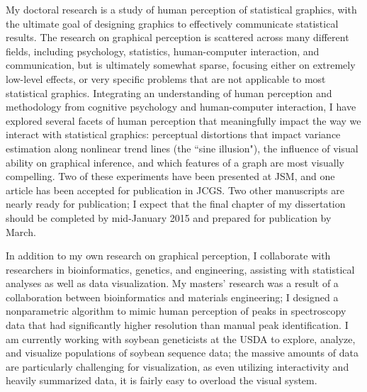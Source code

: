 \documentclass[11pt,letterpaper,sans,unicode]{moderncv}        %
\begin{document}
\vspace{.5cm}
My doctoral research is a study of human perception of statistical graphics, with the ultimate goal of designing graphics to effectively communicate statistical results. The research on graphical perception is scattered across many different fields, including psychology, statistics, human-computer interaction, and communication, but is ultimately somewhat sparse, focusing either on extremely low-level effects, or very specific problems that are not applicable to most statistical graphics. Integrating an understanding of human perception and methodology from cognitive psychology and human-computer interaction, I have explored several facets of human perception that meaningfully impact the way we interact with statistical graphics: perceptual distortions that impact variance estimation along nonlinear trend lines (the ``sine illusion"), the influence of visual ability on graphical inference, and which features of a graph are most visually compelling. Two of these experiments have been presented at JSM, and one article has been accepted for publication in JCGS. Two other manuscripts are nearly ready for publication; I expect that the final chapter of my dissertation should be completed by mid-January 2015 and prepared for publication by March. 

\vspace{.25cm}
In addition to my own research on graphical perception, I collaborate with researchers in bioinformatics, genetics, and engineering, assisting with statistical analyses as well as data visualization. My masters' research was a result of a collaboration between bioinformatics and materials engineering; I designed a nonparametric algorithm to mimic human perception of peaks in spectroscopy data that had significantly higher resolution than manual peak identification. I am currently working with soybean geneticists at the USDA to explore, analyze, and visualize populations of soybean sequence data; the massive amounts of data are particularly challenging for visualization, as even utilizing interactivity and heavily summarized data, it is fairly easy to overload the visual system. 
\end{document}
